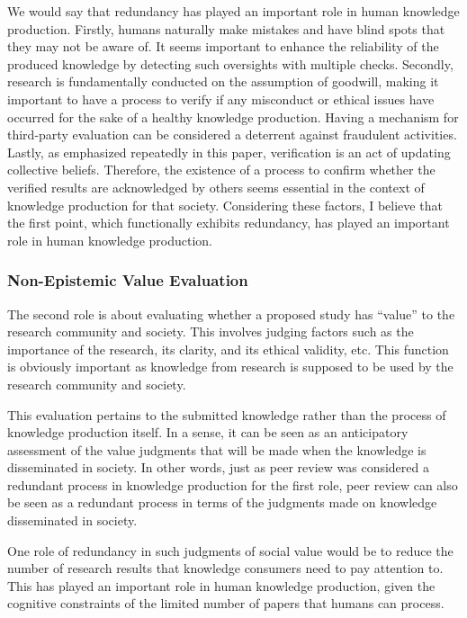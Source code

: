 \documentclass{book}
\begin{document}
We would say that redundancy has played an important role in human knowledge production. Firstly, humans naturally make mistakes and have blind spots that they may not be aware of. It seems important to enhance the reliability of the produced knowledge by detecting such oversights with multiple checks. Secondly, research is fundamentally conducted on the assumption of goodwill, making it important to have a process to verify if any misconduct or ethical issues have occurred for the sake of a healthy knowledge production. Having a mechanism for third-party evaluation can be considered a deterrent against fraudulent activities. Lastly, as emphasized repeatedly in this paper, verification is an act of updating collective beliefs. Therefore, the existence of a process to confirm whether the verified results are acknowledged by others seems essential in the context of knowledge production for that society. Considering these factors, I believe that the first point, which functionally exhibits redundancy, has played an important role in human knowledge production.

\subsubsection{Non-Epistemic Value Evaluation}

The second role is about evaluating whether a proposed study has ``value'' to the research community and society. This involves judging factors such as the importance of the research, its clarity, and its ethical validity, etc. This function is obviously important as knowledge from research is supposed to be used by the research community and society.

This evaluation pertains to the submitted knowledge rather than the process of knowledge production itself. In a sense, it can be seen as an anticipatory assessment of the value judgments that will be made when the knowledge is disseminated in society. In other words, just as peer review was considered a redundant process in knowledge production for the first role, peer review can also be seen as a redundant process in terms of the judgments made on knowledge disseminated in society.

One role of redundancy in such judgments of social value would be to reduce the number of research results that knowledge consumers need to pay attention to. This has played an important role in human knowledge production, given the cognitive constraints of the limited number of papers that humans can process.
\end{document}

